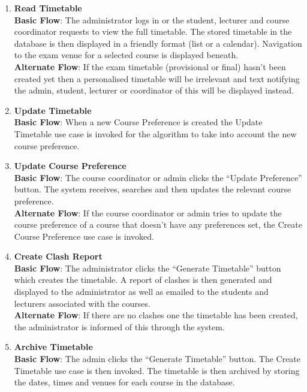 \documentclass{article}
\begin{document}
\begin{enumerate}
\item \textbf{Read Timetable} \\
\textbf{Basic Flow}: The administrator logs in or the student, lecturer and course coordinator requests to view the full timetable. The stored timetable in the database is then displayed in a friendly format (list or a calendar). Navigation to the exam venue for a selected course is displayed beneath. \\
\textbf{Alternate Flow}: If the exam timetable (provisional or final) hasn’t been created yet then a personalised timetable will be irrelevant and text notifying the admin, student, lecturer or coordinator of this will be displayed instead.

\item \textbf{Update Timetable} \\
\textbf{Basic Flow}: When a new Course Preference is created the Update Timetable use case is invoked for the algorithm to take into account the new course preference. 

\item \textbf{Update Course Preference} \\
\textbf{Basic Flow}: The course coordinator or admin clicks the “Update Preference” button. The system receives, searches and then updates the relevant course preference. \\
\textbf{Alternate Flow}: If the course coordinator or admin tries to update the course preference of a course that doesn’t have any preferences set, the Create Course Preference use case is invoked.

\item \textbf{Create Clash Report} \\
\textbf{Basic Flow}: The administrator clicks the “Generate Timetable” button which creates the timetable. A report of clashes is then generated and displayed to the administrator as well as emailed to the students and lecturers associated with the courses. \\
\textbf{Alternate Flow}: If there are no clashes one the timetable has been created, the administrator is informed of this through the system.

\item \textbf{Archive Timetable} \\
\textbf{Basic Flow}: The admin clicks the “Generate Timetable” button. The Create Timetable use case is then invoked. The timetable is then archived by storing the dates, times and venues for each course in the database.

\end{enumerate}
\end{document}
